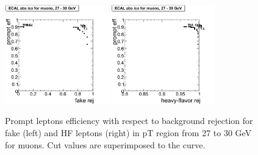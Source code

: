 \begin{figure}[htbp]
\begin{center}
 \includegraphics[width = 0.4\textwidth]{pictures/trackCut/bkgdRej_sigEff/muon_fake_ptCut8_ptCut9.png}
\includegraphics[width = 0.4\textwidth]{pictures/trackCut/bkgdRej_sigEff/muon_nonPrompt_ptCut8_ptCut9.png}
\caption{\small{Prompt leptons efficiency with respect to background 
rejection for fake (left) and HF leptons (right) in pT region
from 27 to 30 GeV for muons. 
Cut values are superimposed to the curve.}\label{fig:ecalrej_mu9}}
\end{center}
\end{figure}
